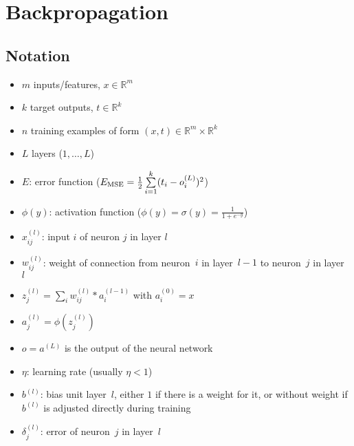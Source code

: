 \section{Backpropagation}\label{sec:backpropagation}

\subsection{Notation}
\begin{itemize}
\item $m$ inputs/features, $x \in \mathbb{R}^m$
\item $k$ target outputs, $t \in \mathbb{R}^k$
\item $n$ training examples of form $(x, t) \in \mathbb{R}^m \times \mathbb{R}^k$
\item $L$ layers ($1,\dots,L$)
\item $E$: error function (\eg $E_\text{MSE} = \frac{1}{2} \sum\limits_{i=1}^k (t_i - o_i^{(L)})^2$)
\item $\phi(y)$: activation function (\eg $\phi(y) = \sigma(y) = \frac{1}{1 + e^{-y}}$)
\item $x_{ij}^{(l)}$: input $i$ of neuron $j$ in layer $l$
\item $w_{ij}^{(l)}$: weight of connection from neuron~$i$ in layer~$l-1$ to neuron~$j$ in layer~$l$
\item $z_j^{(l)} = \sum\limits_i w_{ij}^{(l)} * a_i^{(l-1)}$ with $a_i^{(0)} = x$
\item $a_j^{(l)} = \phi(z_j^{(l)})$
\item $o = a^{(L)}$ is the output of the neural network
\item $\eta$: learning rate (usually $\eta < 1$)
\item $b^{(l)}$: bias unit layer~$l$, either $1$ if there is a weight for it, or without weight if $b^{(l)}$ is adjusted directly during training
\item $\delta_j^{(l)}$: error of neuron~$j$ in layer~$l$
\end{itemize}

